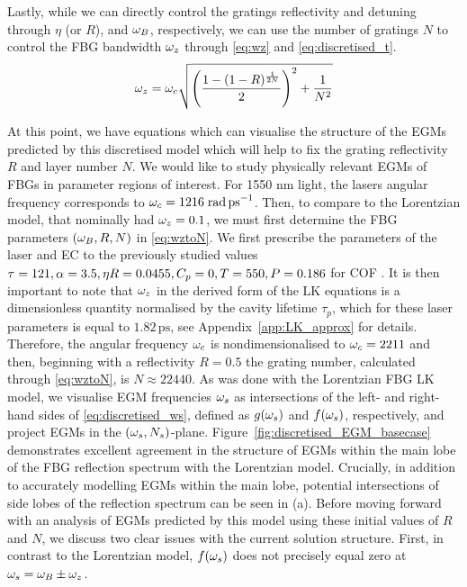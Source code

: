%
Lastly, while we can directly control the gratings reflectivity and detuning through $\eta$ (or $R$), and $\omega_B$, respectively, 
we can use the number of gratings $N$ to control the FBG bandwidth $\omega_z$ through \eqref{eq:wz} and \eqref{eq:discretised_t}.
%
\begin{equation}
    \label{eq:wztoN}
    \omega_z = \omega_c \sqrt{\left( \frac{1 - (1 - R)^\frac{1}{2N}}{2} \right)^2 + \frac{1}{N^2}}
\end{equation}
%
\par
%
At this point, we have equations which can visualise the structure of the EGMs predicted by this discretised model which will help to fix the grating reflectivity $R$ and layer number $N$. 
We would like to study physically relevant EGMs of FBGs in parameter regions of interest. 
For 1550 nm light, the lasers angular frequency corresponds to $\omega_c=1216\;\text{rad\,ps}^{-1}$. 
Then, to compare to the Lorentzian model, that nominally had $\omega_z = 0.1$, we must first determine the FBG parameters $(\omega_B, R, N)$ in \eqref{eq:wztoN}. 
We first prescribe the parameters of the laser and EC to the previously studied values $\tau = 121, \alpha = 3.5, \eta R = 0.0455, C_p = 0, T = 550, P = 0.186$ for COF \cite{heil2003delay}. 
It is then important to note that $\omega_z$ in the derived form of the LK equations is a dimensionless quantity normalised by the cavity lifetime $\tau_p$, 
which for these laser parameters is equal to $1.82 \,\text{ps}$, see Appendix~\ref{app:LK_approx} for details. 
Therefore, the angular frequency $\omega_c$ is nondimensionalised to $\omega_c=2211$ and then, beginning with a reflectivity $R = 0.5$ the grating number, calculated through \eqref{eq:wztoN}, is $N \approx 22440$. 
As was done with the Lorentzian FBG LK model, we visualise EGM frequencies $\omega_s$ as intersections of the left- and right-hand sides of \eqref{eq:discretised_ws}, 
defined as $g(\omega_s)$ and $f(\omega_s)$, respectively, and project EGMs in the $(\omega_s, N_s)$-plane. 
Figure~\ref{fig:discretised_EGM_basecase} demonstrates excellent agreement in the structure of EGMs within the main lobe of the FBG reflection spectrum with the Lorentzian model. 
Crucially, in addition to accurately modelling EGMs within the main lobe, potential intersections of side lobes of the reflection spectrum can be seen in (a). 
Before moving forward with an analysis of EGMs predicted by this model using these initial values of $R$ and $N$, we discuss two clear issues with the current solution structure. 
First, in contrast to the Lorentzian model, $f(\omega_s)$ does not precisely equal zero at $\omega_s = \omega_B \pm \omega_z$. 
